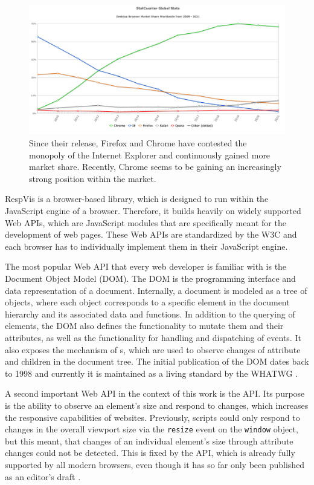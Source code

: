 \begin{figure}[tp]
\centering
\includegraphics[keepaspectratio,width=\linewidth,height=\fullh / 2]{diagrams/browser-market-share.pdf}
\caption[Desktop Browser Market Share]{
  Since their release, Firefox and Chrome have contested the monopoly of the Internet Explorer and continuously gained more market share. 
  Recently, Chrome seems to be gaining an increasingly strong position within the market. 
  }
\label{fig:BrowserMarketShare}
\end{figure}

RespVis is a browser-based library, which is designed to run within the JavaScript engine of a browser. 
Therefore, it builds heavily on widely supported Web APIs, which are JavaScript modules that are specifically meant for the development of web pages. 
These Web APIs are standardized by the W3C and each browser has to individually implement them in their JavaScript engine.

The most popular Web API that every web developer is familiar with is the Document Object Model (DOM). 
The DOM is the programming interface and data representation of a document. 
Internally, a document is modeled as a tree of objects, where each object corresponds to a specific element in the document hierarchy and its associated data and functions. 
In addition to the querying of elements, the DOM also defines the functionality to mutate them and their attributes, as well as the functionality for handling and dispatching of events. 
It also exposes the mechanism of s, which are used to observe changes of attribute and children in the document tree. 
The initial publication of the DOM dates back to 1998 \parencite{DOM1} and currently it is maintained as a living standard by the WHATWG \parencite{DOM}.

A second important Web API in the context of this work is the  API. 
Its purpose is the ability to observe an element's size and respond to changes, which increases the responsive capabilities of websites. 
Previously, scripts could only respond to changes in the overall viewport size via the \lstinline{resize} event on the \lstinline{window} object, but this meant, that changes of an individual element's size through attribute changes could not be detected. 
This is fixed by the  API, which is already fully supported by all modern browsers, even though it has so far only been published as an editor's draft \parencite{ResizeObserver}.

